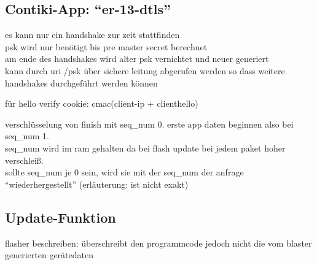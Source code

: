 \subsection{Contiki-App: "`er-13-dtls"'}
es kann nur ein handshake zur zeit stattfinden\\
psk wird nur benötigt bis pre master secret berechnet\\
am ende des handshakes wird alter psk vernichtet und neuer generiert\\
kann durch uri /psk über sichere leitung abgerufen werden so dass weitere handshakes durchgeführt werden können

für hello verify cookie: cmac(client-ip + clienthello)

verschlüsselung von finish mit seq\_num 0. erste app daten beginnen also bei seq\_num 1.\\
seq\_num wird im ram gehalten da bei flash update bei jedem paket hoher verschleiß.\\
sollte seq\_num je 0 sein, wird sie mit der seq\_num der anfrage "`wiederhergestellt"' (erläuterung: ist nicht exakt)

\subsection{Update-Funktion}
flasher beschreiben: überschreibt den programmcode jedoch nicht die vom blaster generierten gerätedaten